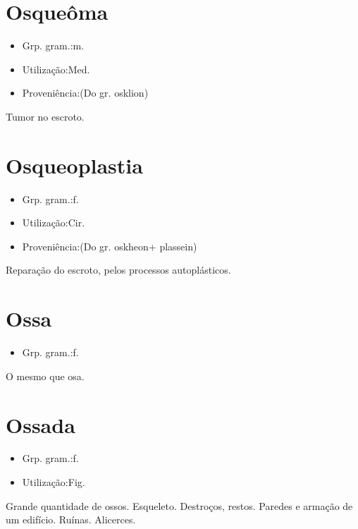 \section{Osqueôma}
\begin{itemize}
\item {Grp. gram.:m.}
\end{itemize}
\begin{itemize}
\item {Utilização:Med.}
\end{itemize}
\begin{itemize}
\item {Proveniência:(Do gr. \textunderscore osklion\textunderscore )}
\end{itemize}
Tumor no escroto.
\section{Osqueoplastia}
\begin{itemize}
\item {Grp. gram.:f.}
\end{itemize}
\begin{itemize}
\item {Utilização:Cir.}
\end{itemize}
\begin{itemize}
\item {Proveniência:(Do gr. \textunderscore oskheon\textunderscore  + \textunderscore plassein\textunderscore )}
\end{itemize}
Reparação do escroto, pelos processos autoplásticos.
\section{Ossa}
\begin{itemize}
\item {Grp. gram.:f.}
\end{itemize}
O mesmo que \textunderscore osa\textunderscore .
\section{Ossada}
\begin{itemize}
\item {Grp. gram.:f.}
\end{itemize}
\begin{itemize}
\item {Utilização:Fig.}
\end{itemize}
Grande quantidade de ossos.
Esqueleto.
Destroços, restos.
Paredes e armação de um edifício.
Ruínas.
Alicerces.
